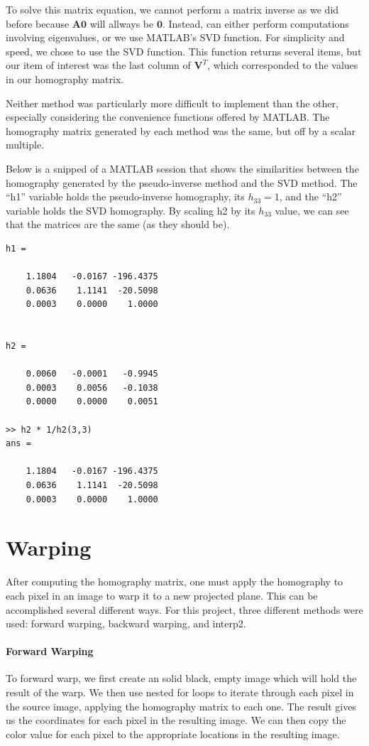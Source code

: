 \documentclass[11pt, letterpaper]{article}
\begin{document}
To solve this matrix equation, we cannot perform a matrix inverse as
we did before because $\mathbf{A}\mathbf{0}$ will allways be
$\mathbf{0}$. Instead, can either perform computations involving
eigenvalues, or we use MATLAB's SVD function. For simplicity and
speed, we chose to use the SVD function. This function returns several
items, but our item of interest was the last column of $\mathbf{V}^T$,
which corresponded to the values in our homography matrix.

Neither method was particularly more difficult to implement than the
other, especially considering the convenience functions offered by
MATLAB. The homography matrix generated by each method was the same,
but off by a scalar multiple. 

Below is a snipped of a MATLAB session that shows the similarities
between the homography generated by the pseudo-inverse method and the
SVD method. The ``h1'' variable holds the pseudo-inverse homography,
its $h_{33}=1$, and the ``h2'' variable holds the SVD homography. By
scaling h2 by its $h_{33}$ value, we can see that the matrices are the
same (as they should be).

\begin{verbatim}
h1 =

    1.1804   -0.0167 -196.4375
    0.0636    1.1141  -20.5098
    0.0003    0.0000    1.0000


h2 =

    0.0060   -0.0001   -0.9945
    0.0003    0.0056   -0.1038
    0.0000    0.0000    0.0051

>> h2 * 1/h2(3,3)
ans =

    1.1804   -0.0167 -196.4375
    0.0636    1.1141  -20.5098
    0.0003    0.0000    1.0000
\end{verbatim}

\section{Warping}
After computing the homography matrix, one must apply the homography
to each pixel in an image to warp it to a new projected plane. This
can be accomplished several different ways. For this project, three
different methods were used: forward warping, backward warping, and
interp2.

\paragraph{Forward Warping}
To forward warp, we first create an solid black, empty image which
will hold the result of the warp. We then use nested for loops to
iterate through each pixel in the source image, applying the
homography matrix to each one. The result gives us the coordinates for
each pixel in the resulting image. We can then copy the color value
for each pixel to the appropriate locations in the resulting
image. 
\end{document}
